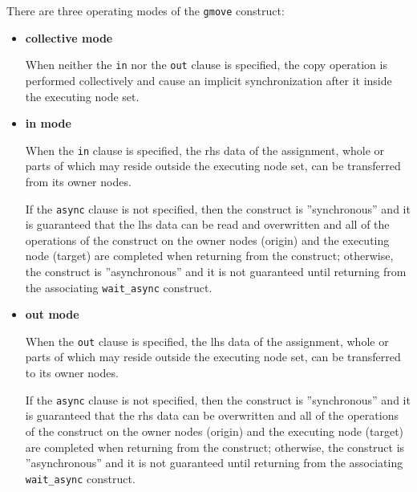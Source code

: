 There are three operating modes of the {\tt gmove} construct:

\begin{itemize}
 \item {\bf collective mode}

       When neither the {\tt in} nor the {\tt out} clause is specified,
       the copy operation is performed collectively and cause an
       implicit synchronization after it inside the executing node set.

%
%

 \item {\bf in mode}

       When the {\tt in} clause is specified, the rhs data of the
       assignment, whole or parts of which may reside outside the
       executing node set, can be transferred from its owner nodes.

       If the {\tt async} clause is not specified, then the construct is
       ''synchronous'' and it is guaranteed that the lhs data
       can be read and overwritten and all of the operations of the
       construct on the owner nodes (origin) and the executing node
       (target) are completed when returning from the construct;
       otherwise, the construct is ''asynchronous'' and it is not
       guaranteed until returning from the associating {\tt wait\_async}
       construct.

 \item {\bf out mode}

       When the {\tt out} clause is specified, the lhs data of the
       assignment, whole or parts of which may reside outside the 
       executing node set, can be transferred to its owner nodes.

       If the {\tt async} clause is not specified, then the construct is
       ''synchronous'' and it is guaranteed that the rhs data
       can be overwritten and all of the operations of the construct on
       the owner nodes (origin) and the executing node (target) are
       completed when returning from the construct; otherwise, the
       construct is ''asynchronous'' and it is not guaranteed until
       returning from the associating {\tt wait\_async} construct.

\end{itemize}


